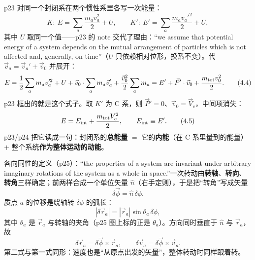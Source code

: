 \documentclass[11pt]{ctexart}
\begin{document}

p23 对同一个封闭系在两个惯性系里各写一次能量：
\[
K:\ E=\sum_a\frac{m_av_a^2}{2}+U,\qquad
K':\ E'=\sum_a\frac{m_av_a'^2}{2}+U ,
\]
其中 $U$ 取同一个值——p23 的 note 交代了理由：“we assume that potential energy of a system depends on the mutual arrangement of particles which is not affected and, generally, on time”（$U$ 只依赖相对位形，换系不变）。代 $\vec v_a=\vec v_a'+\vec v_0$ 并展开：
\[
E=\frac12\sum_am_av_a'^2+U+\vec v_0\cdot\sum_am_a\vec v_a'+\frac{\vec v_0^2}{2}\sum_am_a
=E'+\vec P'\cdot\vec v_0+\frac{m_{\rm tot}v_0^2}{2}. \tag{4.4}
\]
p23 框出的就是这个式子。取 $K'$ 为 C 系，则 $\vec P'=0$、$\vec v_0=\vec V_c$，中间项消失：
\[
E=E_{\rm int}+\frac{m_{\rm tot}V_c^2}{2},\qquad E_{\rm int}\equiv E' . \tag{4.5}
\]
p23/p24 把它读成一句：封闭系的\textbf{总能量} $=$ 它的\textbf{内能}（在 C 系里量到的能量）$+$ 整个系统\textbf{作为整体运动的动能}。






各向同性的定义（p25）：“the properties of a system are invariant under arbitrary imaginary rotations of the system as a whole in space.”一次转动由\textbf{转轴}、\textbf{转向}、\textbf{转角}三样确定；前两样合成一个单位矢量 $\hat n$（右手定则），于是把“转角”写成矢量
\[
\delta\vec\phi=\hat n\,\delta\phi .
\]
质点 $a$ 的位移是绕轴转 $\delta\phi$ 的弧长：
\[
|\delta\vec r_a|=|\vec r_a|\sin\theta_a\,\delta\phi ,
\]
其中 $\theta_a$ 是 $\vec r_a$ 与转轴的夹角（p25 图上标的正是 $\theta_a$）。方向同时垂直于 $\hat n$ 与 $\vec r_a$，故
\[
\delta\vec r_a=\delta\vec\phi\times\vec r_a ,\qquad
\delta\vec v_a=\delta\vec\phi\times\vec v_a . \tag{5.1}
\]
第二式与第一式同形：速度也是“从原点出发的矢量”，整体转动时同样跟着转。
\end{document}
